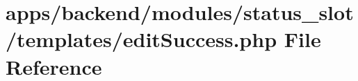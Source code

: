 \hypertarget{backend_2modules_2status__slot_2templates_2edit_success_8php}{\section{apps/backend/modules/status\-\_\-slot/templates/edit\-Success.php File Reference}
\label{backend_2modules_2status__slot_2templates_2edit_success_8php}
}
